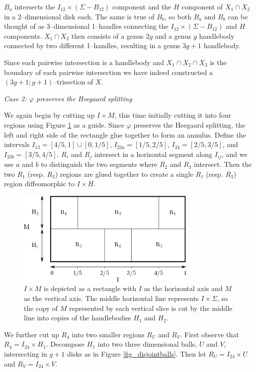 \documentclass[12pt]{amsart}
\theoremstyle{definition}
\theoremstyle{remark}
\begin{document}
$B_a$ intersects the $I_{12} \times (\Sigma - B_{12})$ component and the $H$ component of $X_1 \cap X_2$ in a 2--dimensional disk each.  The same is true of $B_b$, so both $B_a$ and $B_b$ can be thought of as 3--dimensional 1--handles connecting the $I_{12} \times (\Sigma - B_{12})$ and $H$ components.  $X_1 \cap X_2$ then consists of a genus $2g$ and a genus $g$ handlebody connected by two different 1--handles, resulting in a genus $3g+1$ handlebody. 

Since each pairwise intersection is a handlebody and $X_1 \cap X_2 \cap X_3$ is the boundary of each pairwise intersection we have indeed constructed a $(3g+1;g+1)$--trisection of $X$.


\smallskip
\noindent\textit{Case 2: $\varphi$ preserves the Heegaard splitting}\ \ 

We again begin by cutting up $I \times M$, this time initially cutting it into four regions using Figure \ref{preservebreakdown} as a guide.  Since $\varphi$ preserves the Heegaard splitting, the left and right side of the rectangle glue together to form an annulus.  Define the intervals $I_{13} = [4/5,1] \cup [0,1/5]$, $I_{23a} = [1/5,2/5]$, $I_{24} = [2/5,3/5]$, and $I_{23b} = [3/5,4/5]$.  $R_i$ and $R_j$ intersect in a horizontal segment along $I_{ij}$, and we use $a$ and $b$ to distinguish the two segments where $R_2$ and $R_3$ intersect.  Then the two $R_1$ (resp. $R_3$) regions are glued together to create a single $R_1$ (resp. $R_3$) region diffeomorphic to $I \times H$.  

\begin{figure}[h]
\centering
\includegraphics[height=1.8in]{MxS1_preserves.png}
\caption{$I \times M$ is depicted as a rectangle with $I$ as the horizontal axis and $M$ as the vertical axis.  The middle horizontal line represents $I \times \Sigma$, so the copy of $M$ represented by each vertical slice is cut by the middle line into copies of the handlebodies $H_1$ and $H_2$.}
\label{preservebreakdown}
\end{figure}

We further cut up $R_4$ into two smaller regions $R_U$ and $R_V$.  First observe that $R_4 = I_{24} \times H_1$.  Decompose $H_1$ into two three dimensional balls, $U$ and $V$, intersecting in $g+1$ disks as in Figure \ref{fig_disjointballs}.  Then let $R_U = I_{24}  \times U$ and $R_V = I_{24} \times V$.  
\end{document}
